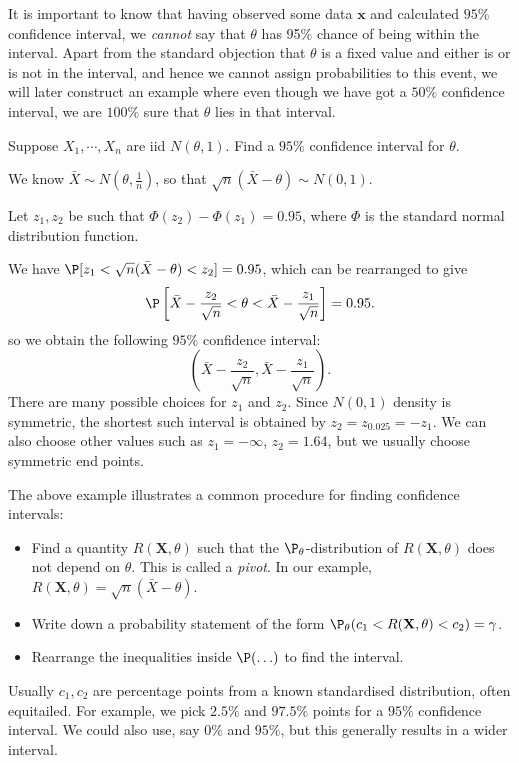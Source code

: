 \documentclass[a4paper]{article}
\begin{document}
It is important to know that having observed some data $\mathbf{x}$ and calculated $95\%$ confidence interval, we \emph{cannot} say that $\theta$ has 95\% chance of being within the interval. Apart from the standard objection that $\theta$ is a fixed value and either is or is not in the interval, and hence we cannot assign probabilities to this event, we will later construct an example where even though we have got a $50\%$ confidence interval, we are $100\%$ sure that $\theta$ lies in that interval.

\begin{eg}
  Suppose $X_1, \cdots, X_n$ are iid $N(\theta, 1)$. Find a $95\%$ confidence interval for $\theta$.

  We know $\bar X \sim N(\theta, \frac{1}{n})$, so that $\sqrt{n}(\bar X - \theta)\sim N(0, 1)$.

  Let $z_1, z_2$ be such that $\Phi(z_2) - \Phi(z_1) = 0.95$, where $\Phi$ is the standard normal distribution function.

  We have $\P[z_1 < \sqrt{n}(\bar X - \theta) < z_2] = 0.95$, which can be rearranged to give
  \[
    \P\left[\bar X - \frac{z_2}{\sqrt{n}} < \theta < \bar X - \frac{z_1}{\sqrt{n}}\right] = 0.95.
  \]
  so we obtain the following $95\%$ confidence interval:
  \[
    \left(\bar X - \frac{z_2}{\sqrt{n}}, \bar X - \frac{z_1}{\sqrt{n}}\right).
  \]
  There are many possible choices for $z_1$ and $z_2$. Since $N(0, 1)$ density is symmetric, the shortest such interval is obtained by $z_2 = z_{0.025} = -z_1$. We can also choose other values such as $z_1 = -\infty$, $z_2 = 1.64$, but we usually choose symmetric end points.
\end{eg}
The above example illustrates a common procedure for finding confidence intervals:
\begin{itemize}
  \item Find a quantity $R(\mathbf{X}, \theta)$ such that the $\P_\theta$-distribution of $R(\mathbf{X}, \theta)$ does not depend on $\theta$. This is called a \emph{pivot}. In our example, $R(\mathbf{X}, \theta) = \sqrt{n}(\bar X - \theta)$.
  \item Write down a probability statement of the form $\P_\theta(c_1 < R(\mathbf{X}, \theta) < c_2) = \gamma$.
  \item Rearrange the inequalities inside $\P(\ldots)$ to find the interval.
\end{itemize}
Usually $c_1, c_2$ are percentage points from a known standardised distribution, often equitailed. For example, we pick $2.5\%$ and $97.5\%$ points for a $95\%$ confidence interval. We could also use, say $0\%$ and $95\%$, but this generally results in a wider interval.
\end{document}
